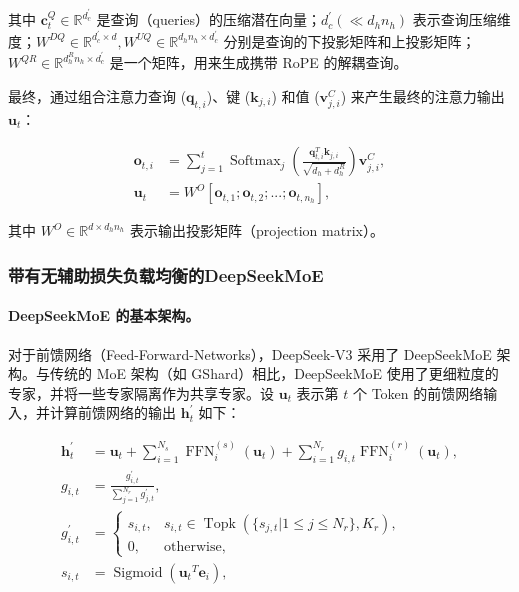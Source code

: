 \documentclass[lang=cn,a4paper,newtx]{elegantpaper}
\newcommand{\dsmoe}{DeepSeekMoE}
\newcommand{\dsviii}{DeepSeek-V3}
\begin{document}
其中 $\mathbf{c}_{t}^{Q} \in \mathbb{R}^{d_c^{\prime}}$ 是查询（queries）的压缩潜在向量；$d_c^{\prime} (\ll d_h n_h)$ 表示查询压缩维度；$W^{DQ} \in \mathbb{R}^{d_c^{\prime} \times d}, W^{UQ} \in \mathbb{R}^{d_h n_h \times d_c^{\prime}}$ 分别是查询的下投影矩阵和上投影矩阵；$W^{QR} \in \mathbb{R}^{d_h^R n_h \times d_c^{\prime}}$ 是一个矩阵，用来生成携带 RoPE 的解耦查询。

最终，通过组合注意力查询 ($\mathbf{q}_{t, i}$)、键 ($\mathbf{k}_{j, i}$) 和值 ($\mathbf{v}_{j, i}^{C}$) 来产生最终的注意力输出 $\mathbf{u}_{t}$：

\begin{align}
    \mathbf{o}_{t, i} &= \sum_{j=1}^{t} \operatorname{Softmax}_j(\frac{\mathbf{q}_{t, i}^T \mathbf{k}_{j, i}}{\sqrt{d_{h} + d_{h}^{R}}}) \mathbf{v}_{j, i}^{C}, \\
    \mathbf{u}_{t} &= W^{O} [\mathbf{o}_{t, 1};\mathbf{o}_{t, 2};...;\mathbf{o}_{t, n_{h}}],
\end{align}

其中 $W^{O} \in \mathbb{R}^{d \times d_h n_h}$ 表示输出投影矩阵（projection matrix）。

\subsubsection{带有无辅助损失负载均衡的\dsmoe{}}

\paragraph{\dsmoe{} 的基本架构。}
对于前馈网络（Feed-Forward-Networks），\dsviii{} 采用了 \dsmoe{} 架构。与传统的 MoE 架构（如 GShard）相比，\dsmoe{} 使用了更细粒度的专家，并将一些专家隔离作为共享专家。设 $\mathbf{u}_{t}$ 表示第 $t$ 个 Token 的前馈网络输入，并计算前馈网络的输出 $\mathbf{h}_{t}^{\prime}$ 如下：

\begin{align}
    \mathbf{h}_{t}^{\prime} & = \mathbf{u}_{t} + \sum_{i=1}^{N_{s}} {\operatorname{FFN}^{(s)}_{i}\left( \mathbf{u}_{t} \right)} + \sum_{i=1}^{N_r} {g_{i,t} \operatorname{FFN}^{(r)}_{i}\left( \mathbf{u}_{t} \right)}, \\
    g_{i,t} & = \frac{g^{\prime}_{i,t}}{\sum_{j=1}^{N_r} g^{\prime}_{j,t}}, \\
    g^{\prime}_{i,t} & = \begin{cases} 
    s_{i,t}, & s_{i,t} \in \operatorname{Topk} (\{ s_{j, t} | 1 \leq j \leq N_r \}, K_{r}), \\
    0, & \text{otherwise}, 
    \end{cases} \\
    s_{i,t} & = \operatorname{Sigmoid} \left( {\mathbf{u}_{t}}^{T} \mathbf{e}_{i} \right),
\end{align}
\end{document}
